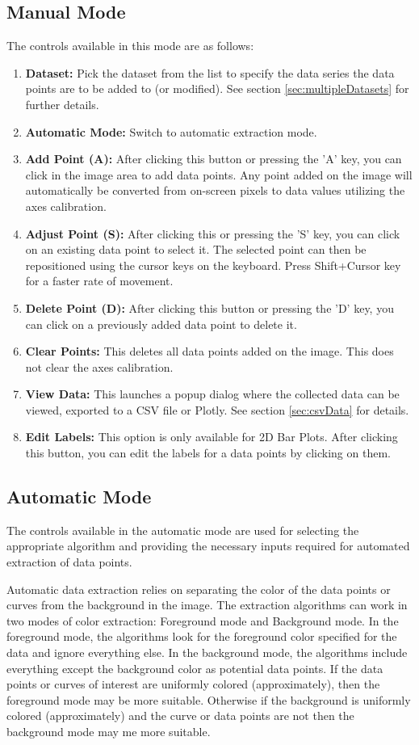 \documentclass[letterpaper, 11pt]{article}
\begin{document}
\subsection{Manual Mode}
The controls available in this mode are as follows:
\begin{enumerate}
\item{{\bf Dataset: }Pick the dataset from the list to specify the data series the data points are to be added to (or modified). See section \ref{sec:multipleDatasets} for further details.}
\item{{\bf Automatic Mode: }Switch to automatic extraction mode.}
\item{{\bf Add Point (A): }After clicking this button or pressing the 'A' key, you can click in the image area to add data points. Any point added on the image will automatically be converted from on-screen pixels to data values utilizing the axes calibration.}
\item{{\bf Adjust Point (S): }After clicking this or pressing the 'S' key, you can click on an existing data point to select it. The selected point can then be repositioned using the cursor keys on the keyboard. Press Shift+Cursor key for a faster rate of movement.}
\item{{\bf Delete Point (D): }After clicking this button or pressing the 'D' key, you can click on a previously added data point to delete it.}
\item{{\bf Clear Points: }This deletes all data points added on the image. This does not clear the axes calibration.}
\item{{\bf View Data: }This launches a popup dialog where the collected data can be viewed, exported to a CSV file or Plotly. See section \ref{sec:csvData} for details.}
\item{{\bf Edit Labels: }This option is only available for 2D Bar Plots. After clicking this button, you can edit the labels for a data points by clicking on them.}
\end{enumerate}

\subsection{Automatic Mode}
The controls available in the automatic mode are used for selecting the appropriate algorithm and providing the necessary inputs required for automated extraction of data points. 

Automatic data extraction relies on separating the color of the data points or curves from the background in the image. The extraction algorithms can work in two modes of color extraction: Foreground mode and Background mode. In the foreground mode, the algorithms look for the foreground color specified for the data and ignore everything else. In the background mode, the algorithms include everything except the background color as potential data points. If the data points or curves of interest are uniformly colored (approximately), then the foreground mode may be more suitable. Otherwise if the background is uniformly colored (approximately) and the curve or data points are not then the background mode may me more suitable.
\end{document}

